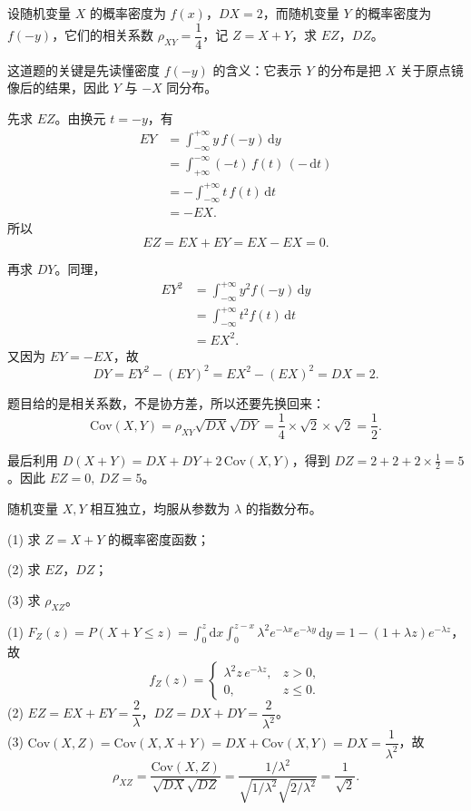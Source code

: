 ﻿\documentclass[lang=cn,11pt]{elegantbook}
\begin{document}
\begin{exercise}\label{exer:4-4-sym}
设随机变量 \(X\) 的概率密度为 \(f(x)\)，\(DX = 2\)，而随机变量 \(Y\) 的概率密度为 \(f(-y)\)，它们的相关系数 \(\rho_{XY} = \dfrac{1}{4}\)，记 \(Z = X + Y\)，求 \(EZ\)，\(DZ\)。
\end{exercise}
\begin{solution}
这道题的关键是先读懂密度 \(f(-y)\) 的含义：它表示 \(Y\) 的分布是把 \(X\) 关于原点镜像后的结果，因此 \(Y\) 与 \(-X\) 同分布。

先求 \(EZ\)。由换元 \(t=-y\)，有
\[
\begin{aligned}
EY
&=\int_{-\infty}^{+\infty} y\,f(-y)\,\mathrm{d}y\\
&=\int_{+\infty}^{-\infty} (-t)\,f(t)\,(-\,\mathrm{d}t)\\
&=-\int_{-\infty}^{+\infty} t\,f(t)\,\mathrm{d}t\\
&=-EX.
\end{aligned}
\]
所以
\[
EZ=EX+EY=EX-EX=0.
\]

再求 \(DY\)。同理，
\[
\begin{aligned}
EY^2
&=\int_{-\infty}^{+\infty} y^2 f(-y)\,\mathrm{d}y\\
&=\int_{-\infty}^{+\infty} t^2 f(t)\,\mathrm{d}t\\
&=EX^2.
\end{aligned}
\]
又因为 \(EY=-EX\)，故
\[
DY=EY^2-(EY)^2=EX^2-(EX)^2=DX=2.
\]

题目给的是相关系数，不是协方差，所以还要先换回来：
\[
\mathrm{Cov}(X,Y)=\rho_{XY}\sqrt{DX}\sqrt{DY}=\frac14\times \sqrt{2}\times \sqrt{2}=\frac12.
\]

最后利用 \(D(X+Y)=DX+DY+2\,\mathrm{Cov}(X,Y)\)，得到 \(DZ=2+2+2\times \frac12=5\)。因此 \(EZ=0,\ DZ=5\)。
\end{solution}

\begin{exercise}\label{exer:4-5-conv}
随机变量 \(X, Y\) 相互独立，均服从参数为 \(\lambda\) 的指数分布。\par
(1) 求 \(Z = X + Y\) 的概率密度函数；\par
(2) 求 \(EZ\)，\(DZ\)；\par
(3) 求 \(\rho_{XZ}\)。
\end{exercise}
\begin{solution}
(1) \(F_Z(z) = P(X+Y \leqslant z) = \displaystyle\int_0^z \mathrm{d}x \int_0^{z-x} \lambda^2 e^{-\lambda x} e^{-\lambda y}\,\mathrm{d}y = 1 - (1+\lambda z)e^{-\lambda z}\)，故
\[
f_Z(z) = \begin{cases} \lambda^2 z\,e^{-\lambda z}, & z > 0, \\[4pt] 0, & z \leqslant 0. \end{cases}
\]
(2) \(EZ = EX + EY = \dfrac{2}{\lambda}\)，\(DZ = DX + DY = \dfrac{2}{\lambda^2}\)。\\
(3) \(\mathrm{Cov}(X,Z) = \mathrm{Cov}(X, X+Y) = DX + \mathrm{Cov}(X,Y) = DX = \dfrac{1}{\lambda^2}\)，故
\[
\rho_{XZ} = \frac{\mathrm{Cov}(X,Z)}{\sqrt{DX}\sqrt{DZ}} = \frac{1/\lambda^2}{\sqrt{1/\lambda^2}\sqrt{2/\lambda^2}} = \frac{1}{\sqrt{2}}.
\]
\end{solution}
\end{document}
